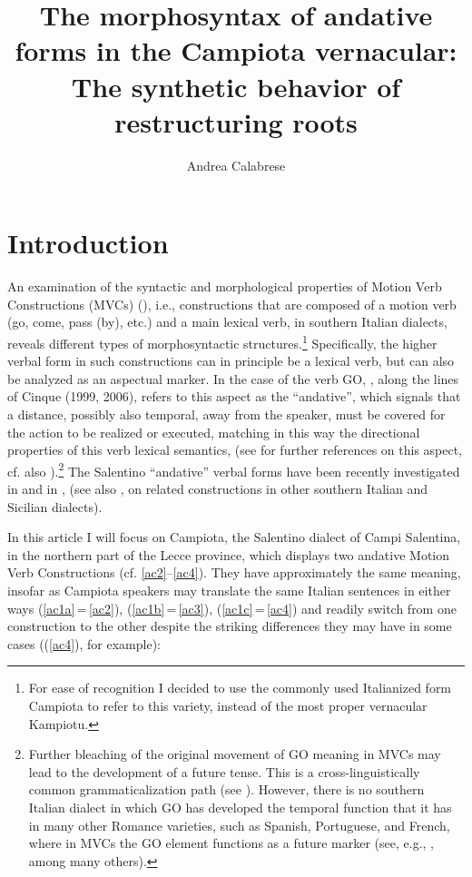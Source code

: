 \documentclass[output=paper]{langscibook}
\author{Andrea Calabrese\affiliation{University of Connecticut}}
\title[The morphosyntax of andative forms in the Campiota vernacular]
      {The morphosyntax of andative forms in the Campiota vernacular: The synthetic behavior of restructuring roots}
\begin{document}
\maketitle

\section{Introduction}


An examination of the syntactic and morphological properties of Motion Verb Constructions (MVCs) (\citealt{cruschina2013a, cruschina2021a}), i.e., constructions that are composed of a motion verb (go, come, pass (by), etc.) and a main lexical verb, in southern Italian dialects, reveals different types of morphosyntactic structures.\footnote{For ease of recognition I decided to use the commonly used Italianized form Campiota to refer to this variety, instead of the most proper vernacular Kampiotu.} Specifically, the higher verbal form in such constructions can in principle be a lexical verb, but can also be analyzed as an aspectual marker. In the case of the verb GO, \cite{cruschina2013a}, along the lines of Cinque (1999, 2006), refers to this aspect as the “andative”, which signals that a distance, possibly also temporal, away from the speaker, must be covered for the action to be realized or executed, matching in this way the directional properties of this verb lexical semantics, (see \cite{cinque2006a} for further references on this aspect, cf. also \cite{heine2018a}).\footnote{Further bleaching of the original movement of GO meaning in MVCs  may lead to the development of a future tense. This is a cross-linguistically common grammaticalization path (see \cite{bybee1994a}). However, there is no southern Italian dialect in which GO has developed the temporal function that it has in many other Romance varieties, such as Spanish, Portuguese, and French, where in MVCs the GO element functions as a future marker (see, e.g., \cite{squartini1998a}, among many others). }   The Salentino “andative” verbal forms have been recently investigated in \cite{ledgeway2016a} and in \cite{manzini2017a}, \cite{cardinaletti2019a} (see also \cite{andriani2017a, cardinaletti2001a, cardinaletti2003a, cruschina2013a, cruschina2021a}, \cite{caro2015a, caro2018a, caro2019a, caro2015b, manzini2005a} on related constructions in other southern Italian and Sicilian dialects). 

In this article I will focus on Campiota, the Salentino dialect of Campi Salentina, in the northern part of the Lecce province, which displays two andative Motion Verb Constructions (cf. \ref{ac2}--\ref{ac4}). They have approximately the same meaning, insofar as Campiota speakers may translate the same Italian sentences in either ways (\ref{ac1a}\,=\,\ref{ac2}), (\ref{ac1b}\,=\,\ref{ac3}), (\ref{ac1c}\,=\,\ref{ac4}) and readily switch from one construction to the other despite the striking differences they may have in some cases ((\ref{ac4}), for example): 
\end{document}
